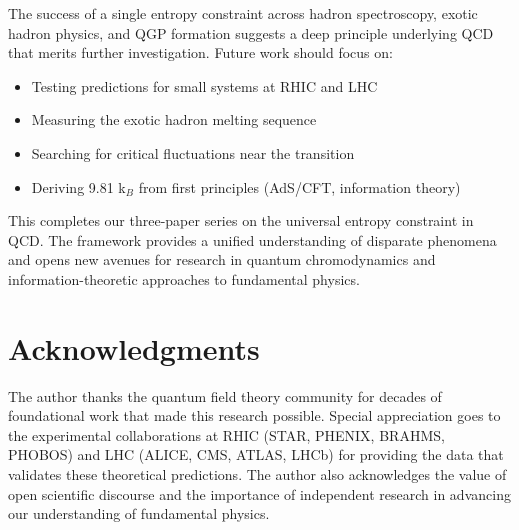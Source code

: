 \documentclass[12pt,a4paper]{article}
\begin{document}
The success of a single entropy constraint across hadron spectroscopy, exotic hadron physics, and QGP formation suggests a deep principle underlying QCD that merits further investigation. Future work should focus on:
\begin{itemize}
\item Testing predictions for small systems at RHIC and LHC
\item Measuring the exotic hadron melting sequence
\item Searching for critical fluctuations near the transition
\item Deriving 9.81 k$_B$ from first principles (AdS/CFT, information theory)
\end{itemize}

This completes our three-paper series on the universal entropy constraint in QCD. The framework provides a unified understanding of disparate phenomena and opens new avenues for research in quantum chromodynamics and information-theoretic approaches to fundamental physics.

\section*{Acknowledgments}

The author thanks the quantum field theory community for decades of foundational work that made this research possible. Special appreciation goes to the experimental collaborations at RHIC (STAR, PHENIX, BRAHMS, PHOBOS) and LHC (ALICE, CMS, ATLAS, LHCb) for providing the data that validates these theoretical predictions. The author also acknowledges the value of open scientific discourse and the importance of independent research in advancing our understanding of fundamental physics.
\end{document}
